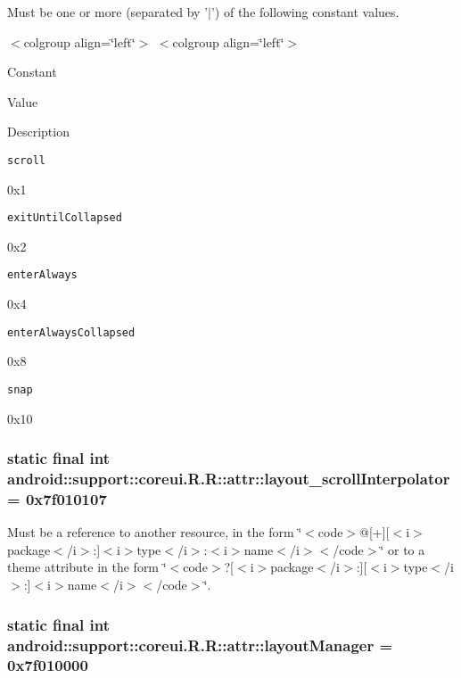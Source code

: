 Must be one or more (separated by '$|$') of the following constant values. \begin{TabularC}{0}
\hline
\end{TabularC}
$<$colgroup align=\char`\"{}left\char`\"{}$>$ $<$colgroup align=\char`\"{}left\char`\"{}$>$ 

Constant

Value

Description 

{\tt scroll}

0x1

{\tt exitUntilCollapsed}

0x2

{\tt enterAlways}

0x4

{\tt enterAlwaysCollapsed}

0x8

{\tt snap}

0x10\hypertarget{classandroid_1_1support_1_1coreui_1_1_r_1_1attr_b25e241d87b556ab895f66cde50ac93d}{
\subsubsection[{layout\_\-scrollInterpolator}]{\setlength{\rightskip}{0pt plus 5cm}static final int android::support::coreui.R.R::attr::layout\_\-scrollInterpolator = 0x7f010107}}
\label{classandroid_1_1support_1_1coreui_1_1_r_1_1attr_b25e241d87b556ab895f66cde50ac93d}


Must be a reference to another resource, in the form \char`\"{}$<$code$>$@\mbox{[}+\mbox{]}\mbox{[}$<$i$>$package$<$/i$>$:\mbox{]}$<$i$>$type$<$/i$>$:$<$i$>$name$<$/i$>$$<$/code$>$\char`\"{} or to a theme attribute in the form \char`\"{}$<$code$>$?\mbox{[}$<$i$>$package$<$/i$>$:\mbox{]}\mbox{[}$<$i$>$type$<$/i$>$:\mbox{]}$<$i$>$name$<$/i$>$$<$/code$>$\char`\"{}. \hypertarget{classandroid_1_1support_1_1coreui_1_1_r_1_1attr_59d8795c534241da1bb81019c0913ab6}{
\subsubsection[{layoutManager}]{\setlength{\rightskip}{0pt plus 5cm}static final int android::support::coreui.R.R::attr::layoutManager = 0x7f010000}}
\label{classandroid_1_1support_1_1coreui_1_1_r_1_1attr_59d8795c534241da1bb81019c0913ab6}


